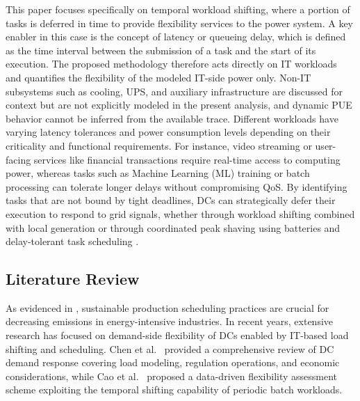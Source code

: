 \documentclass[preprint,12pt]{elsarticle}
\begin{document}
This paper focuses specifically on temporal workload shifting, where a portion of tasks is deferred in time to provide flexibility services to the power system. A key enabler in this case is the concept of latency or queueing delay, which is defined as the time interval between the submission of a task and the start of its execution. %
The proposed methodology therefore acts directly on IT workloads and quantifies the flexibility of the modeled IT-side power only. Non-IT subsystems such as cooling, UPS, and auxiliary infrastructure are discussed for context but are not explicitly modeled in the present analysis, and dynamic PUE behavior cannot be inferred from the available trace. Different workloads have varying latency tolerances and power consumption levels depending on their criticality and functional requirements. For instance, video streaming or user-facing services like financial transactions require real-time access to computing power, whereas tasks such as Machine Learning (ML) training or batch processing can tolerate longer delays without compromising QoS. By identifying tasks that are not bound by tight deadlines, DCs can strategically defer their execution to respond to grid signals, whether through workload shifting combined with local generation \cite{Liu2013} or through coordinated peak shaving using batteries and delay-tolerant task scheduling \cite{Dabbagh2019}.






\subsection{Literature Review}\label{sec:literature_review}

As evidenced in \cite{Fisco-Compte2025}, sustainable production scheduling practices are crucial for decreasing emissions in energy-intensive industries. In recent years, extensive research has focused on demand-side flexibility of DCs enabled by IT-based load shifting and scheduling. Chen et al.\ \cite{CHEN2020109466} provided a comprehensive review of DC demand response covering load modeling, regulation operations, and economic considerations, while Cao et al.\ \cite{CAO2022119665} proposed a data-driven flexibility assessment scheme exploiting the temporal shifting capability of periodic batch workloads.
\end{document}
